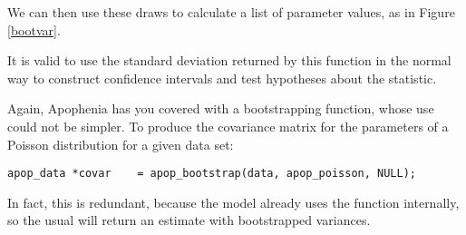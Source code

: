 We can then use these draws to calculate a list of parameter values, as in Figure \ref{bootvar}.

It is valid to use the standard deviation returned by this function 
in the normal way to construct confidence intervals and test
hypotheses about the statistic.

Again, Apophenia has you covered with a bootstrapping function, whose
use could not be simpler. To produce the covariance matrix for the
parameters of a Poisson distribution for a given data set:
\begin{lstlisting}
apop_data *covar    = apop_bootstrap(data, apop_poisson, NULL);
\end{lstlisting}
In fact, this is redundant, because the 
model already uses the  function internally,
so the usual 
will return an estimate with bootstrapped variances.
